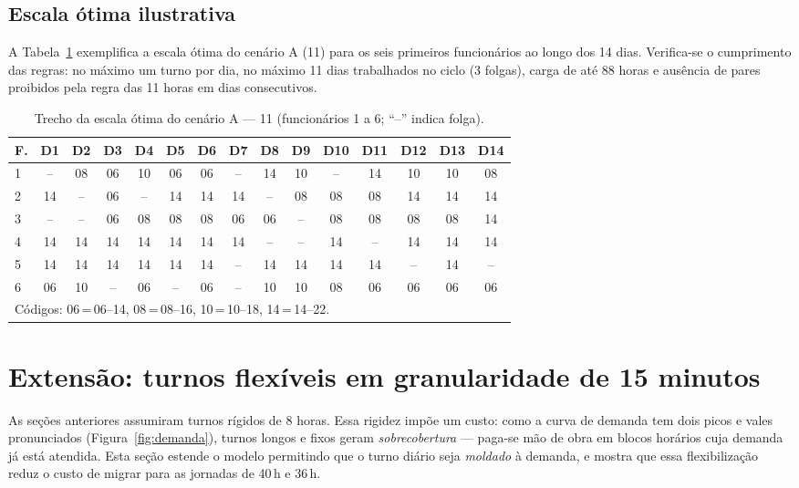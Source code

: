 \documentclass[12pt,a4paper]{article}
\begin{document}
\subsection{Escala ótima ilustrativa}

A Tabela~\ref{tab:escala} exemplifica a escala ótima do cenário A
(11) para os seis primeiros funcionários ao longo dos 14 dias.
Verifica-se o cumprimento das regras: no máximo um turno por dia, no máximo 11
dias trabalhados no ciclo (3 folgas), carga de até 88 horas e ausência de
pares proibidos pela regra das 11 horas em dias consecutivos.

\begin{table}[htb]
\centering
\caption{Trecho da escala ótima do cenário A --- 11
(funcionários 1 a 6; ``--'' indica folga).}
\label{tab:escala}
\scriptsize
\setlength{\tabcolsep}{3pt}
\begin{tabular}{l*{14}{c}}
\toprule
F. & D1 & D2 & D3 & D4 & D5 & D6 & D7 & D8 & D9 & D10 & D11 & D12 & D13 & D14\\
\midrule
1 & -- & 08 & 06 & 10 & 06 & 06 & -- & 14 & 10 & -- & 14 & 10 & 10 & 08\\
2 & 14 & -- & 06 & -- & 14 & 14 & 14 & -- & 08 & 08 & 08 & 14 & 14 & 14\\
3 & -- & -- & 06 & 08 & 08 & 08 & 06 & 06 & -- & 08 & 08 & 08 & 08 & 14\\
4 & 14 & 14 & 14 & 14 & 14 & 14 & 14 & -- & -- & 14 & -- & 14 & 14 & 14\\
5 & 14 & 14 & 14 & 14 & 14 & 14 & -- & 14 & 14 & 14 & 14 & -- & 14 & --\\
6 & 06 & 10 & -- & 06 & -- & 06 & -- & 10 & 10 & 08 & 06 & 06 & 06 & 06\\
\bottomrule
\multicolumn{15}{l}{\scriptsize Códigos: 06\,=\,06--14, 08\,=\,08--16,
10\,=\,10--18, 14\,=\,14--22.}\\
\end{tabular}
\end{table}

\section{Extensão: turnos flexíveis em granularidade de 15 minutos}
\label{sec:flexivel}

As seções anteriores assumiram turnos rígidos de 8 horas. Essa rigidez impõe
um custo: como a curva de demanda tem dois picos e vales pronunciados
(Figura~\ref{fig:demanda}), turnos longos e fixos geram \emph{sobrecobertura}
--- paga-se mão de obra em blocos horários cuja demanda já está atendida. Esta
seção estende o modelo permitindo que o turno diário seja \emph{moldado} à
demanda, e mostra que essa flexibilização reduz o custo de migrar para as
jornadas de 40\,h e 36\,h.
\end{document}

